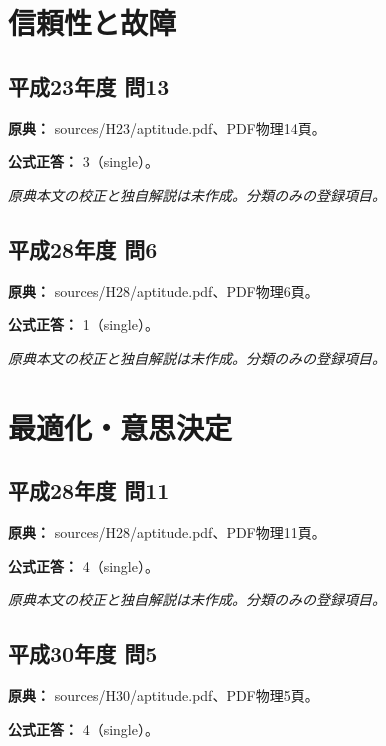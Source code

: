 \section{信頼性と故障}

\subsection{平成23年度 問13}
\label{q:h23-reg-apt-13}

\noindent\textbf{原典：} sources/H23/aptitude.pdf、PDF物理14頁。

\textbf{公式正答：} 3（single）。

\par\textit{原典本文の校正と独自解説は未作成。分類のみの登録項目。}

\subsection{平成28年度 問6}
\label{q:h28-reg-apt-06}

\noindent\textbf{原典：} sources/H28/aptitude.pdf、PDF物理6頁。

\textbf{公式正答：} 1（single）。

\par\textit{原典本文の校正と独自解説は未作成。分類のみの登録項目。}

\section{最適化・意思決定}

\subsection{平成28年度 問11}
\label{q:h28-reg-apt-11}

\noindent\textbf{原典：} sources/H28/aptitude.pdf、PDF物理11頁。

\textbf{公式正答：} 4（single）。

\par\textit{原典本文の校正と独自解説は未作成。分類のみの登録項目。}

\subsection{平成30年度 問5}
\label{q:h30-reg-apt-05}

\noindent\textbf{原典：} sources/H30/aptitude.pdf、PDF物理5頁。

\textbf{公式正答：} 4（single）。

